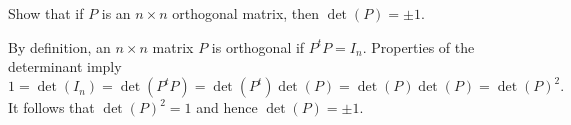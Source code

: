 \documentclass{ximera}
\author{Matthew Carr}
\begin{document}

\begin{exercise}\label{mc.exercise10}

Show that if $P$ is an $n\times n$ orthogonal matrix, then $\det(P) = \pm 1$.
  
\begin{solution}


\soln By definition, an $n\times n$ matrix $P$ is orthogonal if $P^t P=I_n$. Properties of the determinant imply 
\[
1=\det(I_n)=\det(P^t P)=\det(P^t)\det(P)=\det(P)\det(P)=\det(P)^2.
\]
It follows that $\det(P)^2=1$ and hence $\det(P)=\pm 1$. 
\end{solution}
\end{exercise}
\end{document}
